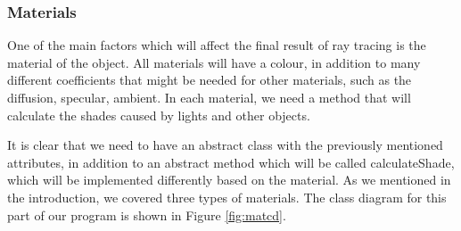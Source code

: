 \documentclass[a4paper]{article}
\begin{document}
	\subsubsection{Materials}
	One of the main factors which will affect the final result of ray tracing is the material of the object. All materials will have a colour, in addition to many different coefficients that might be needed for other materials, such as the diffusion, specular, ambient. In each material, we need a method that will calculate the shades caused by lights and other objects. \\
	\par It is clear that we need to have an abstract class with the previously mentioned attributes, in addition to an abstract method which will be called calculateShade, which will be implemented differently based on the material. As we mentioned in the introduction, we covered three types of materials. The class diagram for this part of our program is shown in Figure \ref{fig:matcd}.
\end{document}

